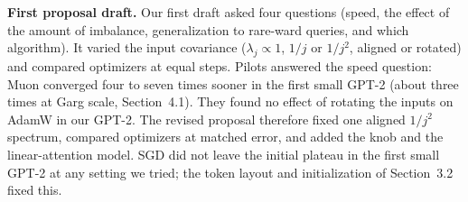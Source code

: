 \textbf{First proposal draft.} Our first draft asked four questions (speed, the effect of the amount of imbalance, generalization to rare-ward queries, and which algorithm). It varied the input covariance ($\lambda_j \propto 1$, $1/j$ or $1/j^2$, aligned or rotated) and compared optimizers at equal steps. Pilots answered the speed question: Muon converged four to seven times sooner in the first small GPT-2 (about three times at Garg scale, Section~4.1). They found no effect of rotating the inputs on AdamW in our GPT-2. The revised proposal therefore fixed one aligned $1/j^2$ spectrum, compared optimizers at matched error, and added the knob and the linear-attention model. SGD did not leave the initial plateau in the first small GPT-2 at any setting we tried; the token layout and initialization of Section~3.2 fixed this.
